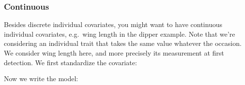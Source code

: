 \documentclass[
  12pt,
]{krantz}
\newenvironment{Shaded}{\begin{snugshade}}{\end{snugshade}}
\newcommand{\DocumentationTok}[1]{\textcolor[rgb]{0.56,0.35,0.01}{\textbf{\textit{#1}}}}
\newcommand{\FunctionTok}[1]{\textcolor[rgb]{0.13,0.29,0.53}{\textbf{#1}}}
\newcommand{\NormalTok}[1]{#1}
\newcommand{\OtherTok}[1]{\textcolor[rgb]{0.56,0.35,0.01}{#1}}
\newcommand{\SpecialCharTok}[1]{\textcolor[rgb]{0.81,0.36,0.00}{\textbf{#1}}}
\begin{document}
\hypertarget{continuous-1}{%
\subsubsection{Continuous}\label{continuous-1}}

Besides discrete individual covariates, you might want to have continuous individual covariates, e.g.~wing length in the dipper example. Note that we're considering an individual trait that takes the same value whatever the occasion. We consider wing length here, and more precisely its measurement at first detection. We first standardize the covariate:

\begin{Shaded}
\end{Shaded}

Now we write the model:
\end{document}
